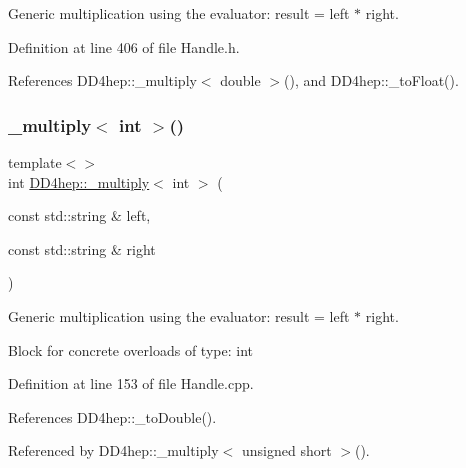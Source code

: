 Generic multiplication using the evaluator\+: result = left $\ast$ right. 



Definition at line 406 of file Handle.\+h.



References D\+D4hep\+::\+\_\+multiply$<$ double $>$(), and D\+D4hep\+::\+\_\+to\+Float().

\hypertarget{group___d_d4_h_e_p___g_e_o_m_e_t_r_y_gac0f9e0aae9992d84617607c75a9524fc}{}\label{group___d_d4_h_e_p___g_e_o_m_e_t_r_y_gac0f9e0aae9992d84617607c75a9524fc} 
\subsubsection{\texorpdfstring{\+\_\+multiply$<$ int $>$()}{\_multiply< int >()}\hspace{0.1cm}{\footnotesize\ttfamily [1/3]}}
{\footnotesize\ttfamily template$<$$>$ \\
int \hyperlink{group___d_d4_h_e_p___g_e_o_m_e_t_r_y_gab860c2299e2eb50e537c5079fb0c9c51}{D\+D4hep\+::\+\_\+multiply}$<$ int $>$ (\begin{DoxyParamCaption}\item[{const std\+::string \&}]{left,  }\item[{const std\+::string \&}]{right }\end{DoxyParamCaption})}



Generic multiplication using the evaluator\+: result = left $\ast$ right. 

Block for concrete overloads of type\+: int 

Definition at line 153 of file Handle.\+cpp.



References D\+D4hep\+::\+\_\+to\+Double().



Referenced by D\+D4hep\+::\+\_\+multiply$<$ unsigned short $>$().

\hypertarget{group___d_d4_h_e_p___g_e_o_m_e_t_r_y_ga31026088d902a9f41a08ff29f894d2c7}{}\label{group___d_d4_h_e_p___g_e_o_m_e_t_r_y_ga31026088d902a9f41a08ff29f894d2c7} 
